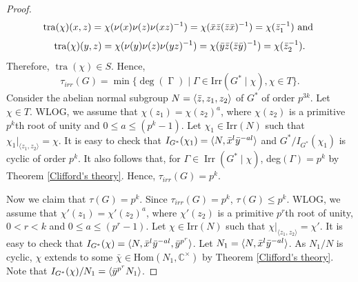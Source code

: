 \documentclass[a4paper,11pt]{amsart}
\numberwithin{equation}{section}
\numberwithin{equation}{subsection}
\newcommand{\C}{\mathbb{C}}
\newcommand{\Hom}{\mathrm{Hom}}
\newcommand{\x}{\Bar{x}}
\newcommand{\y}{\Bar{y}}
\newcommand{\z}{\Bar{z}}
\newcommand{\poonam}[1]{{\color{blue} #1}}
\begin{document}
\begin{proof}
	$$\operatorname{tra}(\chi)(x, z) = \chi(\nu(x)\nu(z)\nu(xz)^{-1})= \chi(\x\z( \z\x)^{-1})= \chi(\z_1^{-1}) \text { and }$$ 
	$$\operatorname{tra}(\chi)(y, z) = \chi(\nu(y)\nu(z)\nu(yz)^{-1})= \chi(\y\z( \z\y)^{-1})= \chi(\z_2^{-1}).$$ 
	Therefore, $\operatorname{tra}(\chi) \in S$.
	Hence, $$\tau_{irr}(G)= \operatorname{min}\{\operatorname{deg}(\operatorname{\Gamma}) \mid \Gamma \in \mathrm{Irr}(G^*\mid \chi), \chi \in T\}.$$
	Consider the abelian normal subgroup $N = \langle \z, z_1, z_2 \rangle$ of $G^*$ of order $p^{3k}$. Let $\chi \in T$. WLOG, we assume that $\chi(z_1) = \chi(z_2)^a$, where $\chi(z_2)$ is a primitive $p^k$th root of unity and $0 \leq a \leq (p^{k}-1)$. 
	Let $\chi_1 \in \text{Irr}(N)$ such that $\chi_1|_{\langle z_1, z_2 \rangle} = \chi$. It is easy to check that $I_{G^*}(\chi_1)= \langle N,\x^{l}\y^{-al}\rangle$ and $G^*/I_{G^*}(\chi_1)$ is cyclic of order $p^k$. It also follows that, for $\Gamma \in \operatorname{Irr}(G^* \mid \chi)$, deg$(\Gamma) = p^k$ by Theorem \ref{Clifford's theory}. Hence, $\tau_{irr}(G)= p^k$. 
	
	
	
	Now we claim that $\tau(G) = p^k$. 
	Since $\tau_{irr}(G)= p^k$, $\tau(G) \leq p^k$. 
	WLOG, we assume that $\chi'(z_1) = \chi'(z_2)^a$, where $\chi'(z_2)$ is a primitive $p^r$th root of unity, $0 <r <k$ and $0 \leq a \leq (p^{r}-1)$.  Let $\chi \in \text{Irr}(N)$ such that $\chi|_{\langle z_1, z_2 \rangle} = \chi'$.
	It is easy to check that $I_{G^*}(\chi) = \langle N,\x^{l}\y^{-al},\y^{p^r} \rangle$. %
	Let $N_1= \langle N,\x^{l}\y^{-al} \rangle$. As $N_1/N$ is cyclic, $\chi$ extends to some $\bar{\chi}\in \Hom(N_1, \C^\times)$ by Theorem \ref{Clifford's theory}. Note that $I_{G^*}(\chi)/N_1 = \langle \y^{p^r}N_1 \rangle$. %
	

\end{proof}
\end{document}
